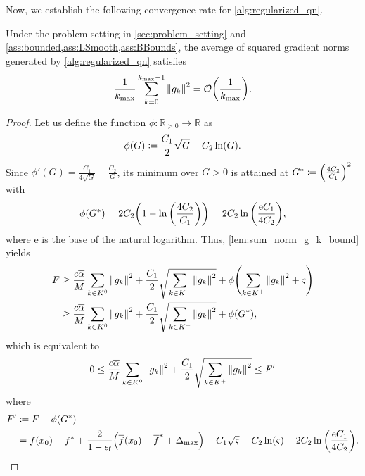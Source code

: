 \documentclass[journal_revised_MPC]{subfiles}
\begin{document}
Now, we establish the following convergence rate for \cref{alg:regularized_qn}.
\begin{theorem}\label{thm:gc}
    Under the problem setting in \cref{sec:problem_setting} and \cref{ass:bounded,ass:LSmooth,ass:BBounds}, the average of squared gradient norms generated by \cref{alg:regularized_qn} satisfies
    \begin{equation*}
        \frac{1}{k_{\max}} \sum_{k=0}^{k_{\max}-1} \norm{g_k}^2 = \order{\frac{1}{k_{\max}}}.
    \end{equation*}
\end{theorem}
\begin{proof}
    Let us define the function $\phi\colon \mathbb{R}_{>0} \to \mathbb{R}$ as
    \begin{equation}\label{eq:phi_G}
        \phi(G) \coloneqq \frac{C_1}{2} \sqrt{G} - C_2 \ln(G).
    \end{equation}
    Since $\phi'(G)= \frac{C_1}{4 \sqrt{G}} - \frac{C_2}{G}$, its minimum over $G>0$ is attained at $G^\ast \coloneqq \qty(\frac{4C_2}{C_1})^2$ with
    \begin{equation*}
        \phi(G^\ast) = 2C_2 \qty(1 - \ln\qty(\frac{4C_2}{C_1})) = 2C_2 \ln\qty(\frac{\mathrm{e} C_1}{4C_2}),
    \end{equation*}
    where $\mathrm{e}$ is the base of the natural logarithm.
    Thus, \cref{lem:sum_norm_g_k_bound} yields
    \begin{align*}
        F
         & \ge
        \frac{c \overline{\alpha}}{M} \sum_{k \in K^0} \norm{g_{k}}^2 + \frac{C_1}{2} \sqrt{\sum_{k \in K^+} \norm{g_{k}}^2} + \phi\qty(\sum_{k \in K^+} \norm{g_{k}}^2 + \varsigma) \\
         & \ge \frac{c \overline{\alpha}}{M} \sum_{k \in K^0} \norm{g_{k}}^2 + \frac{C_1}{2} \sqrt{\sum_{k \in K^+} \norm{g_{k}}^2} + \phi(G^\ast),
    \end{align*}
    which is equivalent to
    \begin{equation}\label{eq:final_inequality_for_gc}
        0 \leq \frac{c \overline{\alpha}}{M} \sum_{k \in K^0} \norm{g_{k}}^2 + \frac{C_1}{2} \sqrt{\sum_{k \in K^+} \norm{g_{k}}^2} \leq F'
    \end{equation}
    where
    \begin{align}
        F' & \coloneqq F - \phi(G^\ast) \notag \\
           & = f(x_0) - f^* + \frac{2}{1-\epsilon_\mathrm{f}} \qty(\overline{f}(x_0) - \overline{f}^* + \Delta_{\max}) + C_1 \sqrt{\varsigma} - C_2 \ln(\varsigma) - 2C_2 \ln\qty(\frac{\mathrm{e} C_1}{4C_2}). \label{eq:def_F_prime}
    \end{align}


\end{proof}
\end{document}
